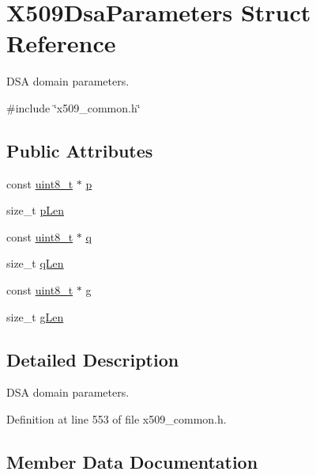 \hypertarget{structX509DsaParameters}{}\section{X509\+Dsa\+Parameters Struct Reference}
\label{structX509DsaParameters}


D\+SA domain parameters.  




{\ttfamily \#include \char`\"{}x509\+\_\+common.\+h\char`\"{}}

\subsection*{Public Attributes}
\begin{DoxyCompactItemize}
\item 
const \hyperlink{stdint_8h_aba7bc1797add20fe3efdf37ced1182c5}{uint8\+\_\+t} $\ast$ \hyperlink{structX509DsaParameters_adf55df7def4d98995045e1c23e995cde}{p}
\item 
size\+\_\+t \hyperlink{structX509DsaParameters_a492453aa50210c40372c6d76ff955c7f}{p\+Len}
\item 
const \hyperlink{stdint_8h_aba7bc1797add20fe3efdf37ced1182c5}{uint8\+\_\+t} $\ast$ \hyperlink{structX509DsaParameters_a8d55a808e46108ce0b7c2af09926f913}{q}
\item 
size\+\_\+t \hyperlink{structX509DsaParameters_a2cb0e6cf41cb0b07dfccedc79bce007e}{q\+Len}
\item 
const \hyperlink{stdint_8h_aba7bc1797add20fe3efdf37ced1182c5}{uint8\+\_\+t} $\ast$ \hyperlink{structX509DsaParameters_ae79dacfe9617adf9d672aa48fe40a3ea}{g}
\item 
size\+\_\+t \hyperlink{structX509DsaParameters_a84e6f3a0159da3fff5bf9315be4cf5f7}{g\+Len}
\end{DoxyCompactItemize}


\subsection{Detailed Description}
D\+SA domain parameters. 

Definition at line 553 of file x509\+\_\+common.\+h.



\subsection{Member Data Documentation}
\mbox{\label{structX509DsaParameters_ae79dacfe9617adf9d672aa48fe40a3ea}} 
